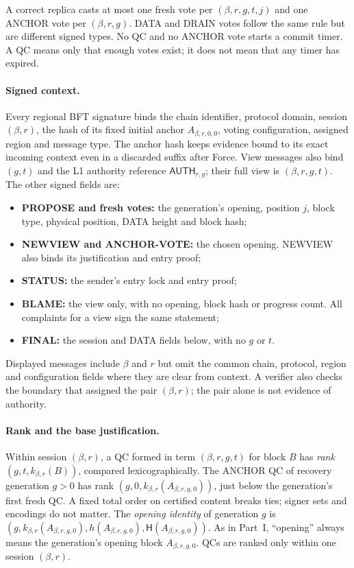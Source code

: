 \documentclass[11pt,a4paper]{article}
\newcommand{\Hash}{\mathsf H}
\newcommand{\tagg}[1]{\ensuremath{\mathsf{#1}}}
\newcommand{\defterm}[1]{\textcolor{rrBlue}{\textit{#1}}}
\newcounter{protocol}
\begin{document}
A correct replica casts at most one fresh vote per $(\beta,r,g,t,j)$ and
one ANCHOR vote per $(\beta,r,g)$. DATA and DRAIN votes follow the same
rule but are different signed types. No QC and no ANCHOR vote starts a
commit timer. A QC means only that enough votes exist; it does not mean
that any timer has expired.

\paragraph{Signed context.}
Every regional BFT signature binds the chain identifier, protocol domain, session
$(\beta,r)$, the hash of its fixed initial anchor $A_{\beta,r,0,0}$,
voting configuration, assigned region and message type. The anchor hash
keeps evidence bound to its exact incoming context even in a discarded
suffix after Force. View messages also bind $(g,t)$ and the L1 authority reference
$\tagg{AUTH}_{r,g}$; their full view is $(\beta,r,g,t)$. The other
signed fields are:
\begin{itemize}
\item \textbf{PROPOSE and fresh votes:} the generation's opening,
position $j$, block type, physical position, DATA height and block hash;
\item \textbf{NEWVIEW and ANCHOR-VOTE:} the chosen opening. NEWVIEW
also binds its justification and entry proof;
\item \textbf{STATUS:} the sender's entry lock and entry proof;
\item \textbf{BLAME:} the view only, with no opening, block hash or
progress count. All complaints for a view sign the same statement;
\item \textbf{FINAL:} the session and DATA fields below, with no $g$ or $t$.
\end{itemize}
Displayed messages include $\beta$ and $r$ but omit the common chain,
protocol, region and configuration fields where they are clear from
context. A verifier also checks the boundary that assigned the pair
$(\beta,r)$; the pair alone is not evidence of authority.

\paragraph{Rank and the base justification.}
Within session $(\beta,r)$, a QC formed in term $(\beta,r,g,t)$ for block
$B$ has \defterm{rank} $(g,t,k_{\beta,r}(B))$, compared lexicographically.
The ANCHOR QC of recovery generation $g>0$ has rank $(g,0,k_{\beta,r}(A_{\beta,r,g,0}))$,
just below the generation's first fresh QC. A fixed total order on
certified content breaks ties; signer sets and encodings do not matter.
The \defterm{opening identity} of generation $g$ is
$(g,k_{\beta,r}(A_{\beta,r,g,0}),h(A_{\beta,r,g,0}),\Hash(A_{\beta,r,g,0}))$.
As in Part~I, ``opening'' always means the generation's opening block
$A_{\beta,r,g,0}$. QCs are ranked only within one session $(\beta,r)$.
\end{document}
